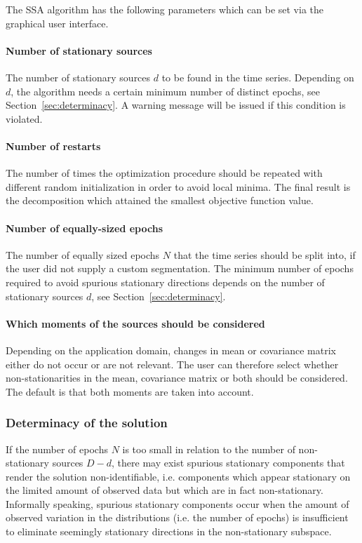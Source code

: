 \documentclass{article}
\newcommand{\1}{\ensuremath{\mathds{1}}}
\newcommand{\0}{\ensuremath{0}}
\begin{document}
The SSA algorithm has the following parameters which can be set via the graphical 
user interface.

\paragraph{Number of stationary sources} The number of stationary sources $d$ to be 
found in the time series. Depending on $d$, the algorithm needs a certain minimum number 
of distinct epochs, see Section~\ref{sec:determinacy}. A warning message will be issued
if this condition is violated.

\paragraph{Number of restarts} The number of times the optimization procedure
should be repeated with different random initialization in order to avoid local minima.
The final result is the decomposition which attained the smallest objective function
value.

\paragraph{Number of equally-sized epochs} The number of equally sized epochs $N$ that 
the time series should be split into, if the user did not supply a custom segmentation.
The minimum number of epochs required to avoid spurious
stationary directions depends on the number of stationary sources $d$, see Section~\ref{sec:determinacy}. 

\paragraph{Which moments of the sources should be considered} Depending on the application domain, 
changes in mean or covariance matrix either do not occur or are not relevant. The user can therefore 
select whether non-stationarities in the mean, covariance matrix or both should be considered. 
The default is that both moments are taken into account.

\subsubsection*{Determinacy of the solution}
\label{sec:determinacy}

If the number of epochs $N$ is too small in relation to the number of 
non-stationary sources $D-d$, there may exist spurious stationary components that render
the solution non-identifiable, i.e. components which appear stationary on the
limited amount of observed data but which are in fact non-stationary.
Informally speaking, spurious stationary components occur when the amount of 
observed variation in the distributions (i.e. the number of epochs) is insufficient 
to eliminate seemingly stationary directions in the non-stationary subspace. 
\end{document}
